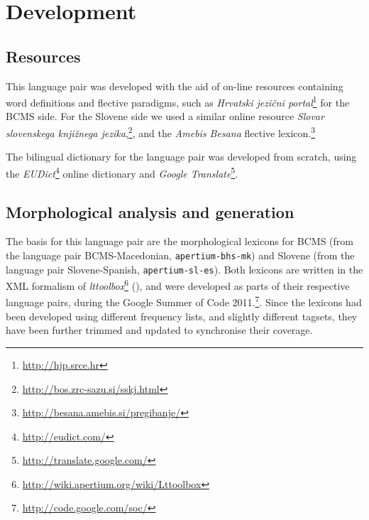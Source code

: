 \section{Development}

\subsection{Resources}
This language pair was developed with the
aid of on-line resources containing word definitions and flective
paradigms, such as \emph{Hrvatski jezični
  portal}\footnote{\url{http://hjp.srce.hr}} for the BCMS side. For
the Slovene side we used a similar online resource \emph{Slovar
  slovenskega knjižnega
  jezika},\footnote{\url{http://bos.zrc-sazu.si/sskj.html}}, and the
\emph{Amebis Besana} flective
lexicon.\footnote{\url{http://besana.amebis.si/pregibanje/}}

The bilingual dictionary for the language pair was developed from scratch,
using the \emph{EUDict}\footnote{\url{http://eudict.com/}} online
dictionary and \emph{Google
  Translate}\footnote{\url{http://translate.google.com/}}.

\subsection{Morphological analysis and generation}
The basis for this language pair are the morphological
lexicons for BCMS (from
the language pair BCMS-Macedonian, {\small{\tt apertium-bhs-mk}}) and Slovene (from the
language pair Slovene-Spanish, {\small{\tt apertium-sl-es}}). Both
lexicons are written in the XML formalism of
\emph{lttoolbox}\footnote{\url{http://wiki.apertium.org/wiki/Lttoolbox}}
(\citealp{rojas2005construccion}), and were developed as parts of
their respective language pairs, during the Google Summer of Code
2011.\footnote{\url{http://code.google.com/soc/}}. Since the lexicons
had been developed using different frequency lists, and slightly
different tagsets, they have been further trimmed and updated to
synchronise their coverage.



